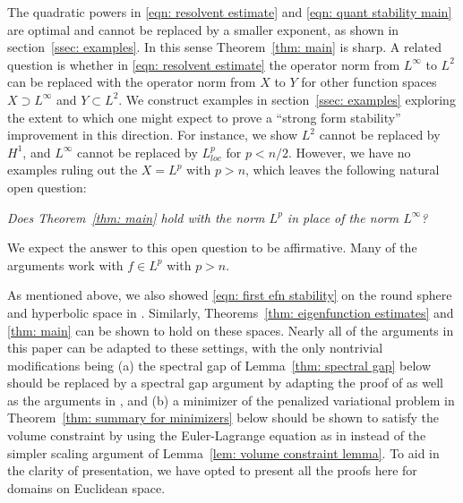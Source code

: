 \documentclass[10pt, reqno]{amsart}
\numberwithin{equation}{section}
\begin{document}
 

The quadratic powers in \eqref{eqn: resolvent estimate} and \eqref{eqn: quant stability main} are optimal and cannot be replaced by a smaller exponent, as shown in section~\ref{ssec: examples}. In this sense Theorem~\ref{thm: main} is sharp. A related question is whether in \eqref{eqn: resolvent estimate} the operator norm from $L^{\infty}$ to $L^2$ can be replaced with  the operator norm from $X$ to $Y$ for other function spaces $X\supset L^{\infty}$ and $Y \subset L^2$. We construct examples in section~\ref{ssec: examples} exploring the extent to which one might expect to prove a ``strong form stability'' improvement in this direction. For instance, we show $L^2$ cannot be replaced by $H^1$, and $L^{\infty}$ cannot be replaced by $L^p_{loc}$ for $p<n/2.$ However, we have no examples ruling out the $X= L^p$ with $p>n$, which leaves the following natural open question:
\smallskip

 {\it Does Theorem~\ref{thm: main} hold with the norm $L^p$ in place of the norm  $L^{\infty}$?
}

\smallskip
 We expect the answer to this open question to be affirmative. Many of the arguments work with $f \in L^p$ with $p>n$. 


As mentioned above, we also showed \eqref{eqn: first efn stability} on the round sphere and hyperbolic space in \cite{AKN1, AKN2}. Similarly, Theorems~\ref{thm: eigenfunction estimates} and \ref{thm: main} can be shown to hold on these spaces. Nearly  all of the arguments in this paper can be adapted to these settings, with the only nontrivial modifications being (a) the spectral gap of Lemma~\ref{thm: spectral gap} below should be replaced by a spectral gap argument by adapting the proof of \cite[Theorem 3.11]{AKN1} as well as the arguments in \cite{p24}, and (b) a minimizer of the penalized variational problem in Theorem~\ref{thm: summary for minimizers} below should be shown to satisfy the volume constraint by using the Euler-Lagrange equation as in \cite[Proposition 9.5]{AKN2} instead of the simpler scaling argument of Lemma~\ref{lem: volume constraint lemma}. To aid in the clarity of presentation, we have opted to present all the proofs here for domains on Euclidean space.

\label{thm: spectral gap}
\end{document}

